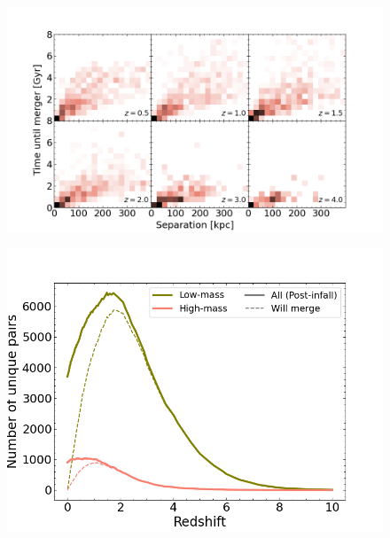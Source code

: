 \documentclass[twocolumn]{aastex631}
\begin{document}
\begin{figure}[htb]
    \centering
    \includegraphics[width=\textwidth]{plots/bet-on-it/3_Timevssephigh-2d.png}
    \caption{}
\end{figure}
\begin{figure}[htb]
    \centering
    \includegraphics[width=0.5\columnwidth]{plots/bet-on-it/3_number_pairs.png}
\end{figure}
\end{document}
